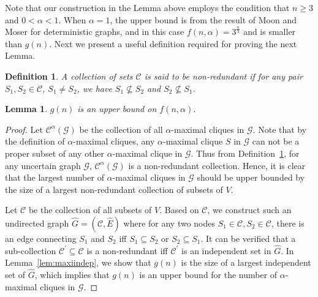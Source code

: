 \documentclass[11pt,letterpaper]{article}
\newtheorem{lemma}{Lemma}
\newtheorem{definition}{Definition}
\newcommand{\ugraph}{\mathcal{G}}
\begin{document}
Note that our construction in the Lemma above employs the condition
that $n \ge 3$ and $0<\alpha <1$. When $\alpha = 1$, the upper bound
is from the result of Moon and Moser for deterministic graphs, and in this
case $f(n,\alpha) = 3^{\frac{n}{3}}$ and is smaller than $g(n)$.
Next we present a useful definition required for proving the next Lemma.

\begin{definition}
\label{defn:non-redundant}
A collection of sets $\mathcal{C}$
is said to be non-redundant if for any pair $S_1, S_2 \in \mathcal{C}$,
$S_1 \ne S_2$, we have $S_1 \nsubseteq S_2$ and $S_2 \nsubseteq S_1$.
\end{definition}

\begin{lemma}
\label{lem:UpperBound}
$g(n)$ is an upper bound on $f(n,\alpha)$.
\end{lemma}

\begin{proof}
Let $\mathcal{C}^{\alpha}(\mathcal{G})$
be the collection of all $\alpha$-maximal cliques in $\mathcal{G}$.
Note that by the definition of $\alpha$-maximal cliques, any
$\alpha$-maximal clique $S$ in $\ugraph$ can not be a proper subset of
any other $\alpha$-maximal clique in $\ugraph$.
Thus from Definition~\ref{defn:non-redundant}, for any uncertain graph 
$\mathcal{G}$, $\mathcal{C}^{\alpha}(\mathcal{G})$ is a non-redundant collection.
Hence, it is clear that the largest number of $\alpha$-maximal cliques in $\ugraph$ 
should be upper bounded by the size of a largest non-redundant collection of subsets of $V$.

Let $\mathcal{C}$ be the collection of all subsets of $V$.
Based on $\mathcal{C}$, we construct such an undirected graph
$\widehat{G}=(\mathcal{C},\widehat{E})$
where for any two nodes $S_1 \in \mathcal{C}, S_2 \in \mathcal{C} $,
there is an edge connecting $S_1$ and $S_2$ iff $S_1 \subseteq S_2$ or $S_2 \subseteq S_1$.
It can be verified that a sub-collection $\mathcal{C}^\prime \subseteq \mathcal{C}$
is a non-redundant iff $\mathcal{C}^\prime$ is an independent set in $\widehat{G}$.
In Lemma~\ref{lem:maxiindep}, we show that $g(n)$
is the size of a largest independent set of $\widehat{G}$,
which implies that $g(n)$ is an upper bound for the number of 
$\alpha$-maximal cliques in $\ugraph$. 
\end{proof}
\end{document}
